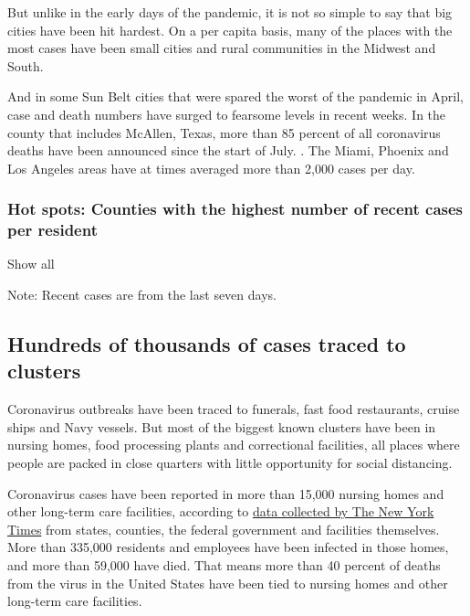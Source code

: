 But unlike in the early days of the pandemic, it is not so simple to say
that big cities have been hit hardest. On a per capita basis, many of
the places with the most cases have been small cities and rural
communities in the Midwest and South.

And in some Sun Belt cities that were spared the worst of the pandemic
in April, case and death numbers have surged to fearsome levels in
recent weeks. In the county that includes McAllen, Texas, more than 85
percent of all coronavirus deaths have been announced since the start of
July. . The Miami, Phoenix and Los Angeles areas have at times averaged
more than 2,000 cases per day.

\hypertarget{hot-spots-counties-with-the-highest-number-of-recent-cases-per-resident}{%
\subsubsection{Hot spots: Counties with the highest number of recent
cases per
resident}\label{hot-spots-counties-with-the-highest-number-of-recent-cases-per-resident}}

Show all

Note: Recent cases are from the last seven days.

\hypertarget{hundreds-of-thousands-of-cases-traced-to-clusters}{%
\subsection{Hundreds of thousands of cases traced to
clusters}\label{hundreds-of-thousands-of-cases-traced-to-clusters}}

Coronavirus outbreaks have been traced to funerals, fast food
restaurants, cruise ships and Navy vessels. But most of the biggest
known clusters have been in nursing homes, food processing plants and
correctional facilities, all places where people are packed in close
quarters with little opportunity for social distancing.

Coronavirus cases have been reported in more than 15,000 nursing homes
and other long-term care facilities, according to
\href{https://www.nytimes.com/interactive/2020/us/coronavirus-nursing-homes.html}{data
collected by The New York Times} from states, counties, the federal
government and facilities themselves. More than 335,000 residents and
employees have been infected in those homes, and more than 59,000 have
died. That means more than 40 percent of deaths from the virus in the
United States have been tied to nursing homes and other long-term care
facilities.

